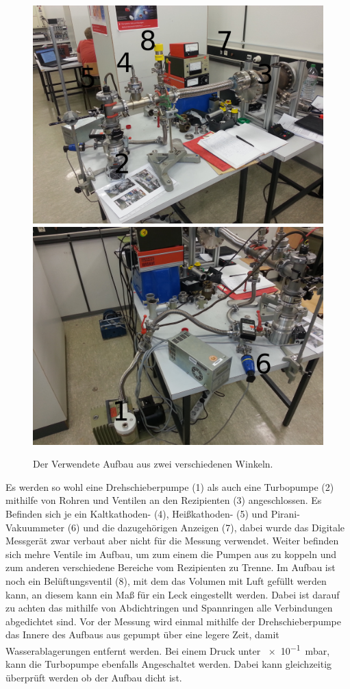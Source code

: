 \begin{figure}[h!]
\centering
\includegraphics[scale=0.06]{../Grafiken/Aufbau_.jpg}
\includegraphics[scale=0.06]{../Grafiken/Drehschieber_.jpg}
\caption{Der Verwendete Aufbau aus zwei verschiedenen Winkeln.\label{fig:Aufbau}}
\end{figure}
Es werden so wohl eine Drehschieberpumpe (1) als auch eine Turbopumpe (2) mithilfe von Rohren und Ventilen an den Rezipienten (3) angeschlossen.
Es Befinden sich je ein Kaltkathoden- (4), Heißkathoden- (5) und Pirani-Vakuummeter (6) und die dazugehörigen Anzeigen (7), dabei wurde das Digitale Messgerät zwar verbaut aber nicht für die Messung verwendet.
Weiter befinden sich mehre Ventile im Aufbau, um zum einem die Pumpen aus zu koppeln und zum anderen verschiedene Bereiche vom Rezipienten zu Trenne. Im Aufbau ist noch ein Belüftungsventil (8), mit dem das Volumen mit Luft gefüllt werden kann, an diesem kann ein Maß für ein Leck eingestellt werden.
Dabei ist darauf zu achten das mithilfe von Abdichtringen und Spannringen alle Verbindungen abgedichtet sind.
Vor der Messung wird einmal mithilfe der Drehschieberpumpe  das Innere des Aufbaus aus gepumpt über eine legere Zeit, damit Wasserablagerungen entfernt werden. Bei einem Druck unter \SI{e-1}{\milli\bar}, kann die Turbopumpe ebenfalls Angeschaltet werden. Dabei kann gleichzeitig überprüft werden ob der Aufbau dicht ist.
